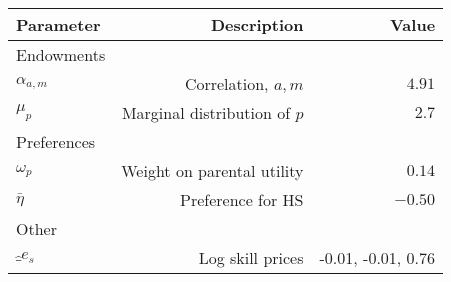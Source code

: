 \begin{tabular}{lrr}
\hline
Parameter & Description  & Value  \\
\hline
Endowments &   &   \\
$\alpha_{a,m}$ & Correlation, $a,m$  & $4.91$  \\
$\mu_{p}$ & Marginal distribution of $p$  & $2.7$  \\
Preferences &   &   \\
$\omega_{p}$ & Weight on parental utility  & $0.14$  \\
$\bar{\eta}$ & Preference for HS  & $-0.50$  \\
Other &   &   \\
$\hat_{e}_{s}$ & Log skill prices  & -0.01, -0.01, 0.76  \\
\hline
\end{tabular}%

